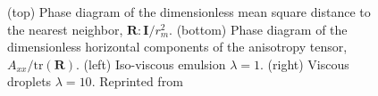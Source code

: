 \begin{figure}[h!]
    \caption{
        (top) Phase diagram of the dimensionless mean square distance to the nearest neighbor, $\textbf{R}:\textbf{I}/r_m^2$.
        (bottom) Phase diagram of the dimensionless horizontal components of the anisotropy tensor, $A_{xx}/\text{tr}(\textbf{R})$.  
        (left) Iso-viscous emulsion $\lambda = 1$.
        (right) Viscous droplets $\lambda = 10$.
        Reprinted from \citet{fintzi2024buoyancy} }
    \label{fig:A}
\end{figure}


